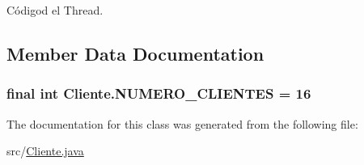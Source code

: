 Códigod el Thread. 



\subsection{Member Data Documentation}
\subsubsection[{\texorpdfstring{N\+U\+M\+E\+R\+O\+\_\+\+C\+L\+I\+E\+N\+T\+ES}{NUMERO_CLIENTES}}]{\setlength{\rightskip}{0pt plus 5cm}final int Cliente.\+N\+U\+M\+E\+R\+O\+\_\+\+C\+L\+I\+E\+N\+T\+ES = 16\hspace{0.3cm}{\ttfamily [static]}}\hypertarget{classCliente_a48a0a2f19643c23979a654493e344bbb}{}\label{classCliente_a48a0a2f19643c23979a654493e344bbb}


The documentation for this class was generated from the following file\+:\begin{DoxyCompactItemize}
\item 
src/\hyperlink{Cliente_8java}{Cliente.\+java}\end{DoxyCompactItemize}
